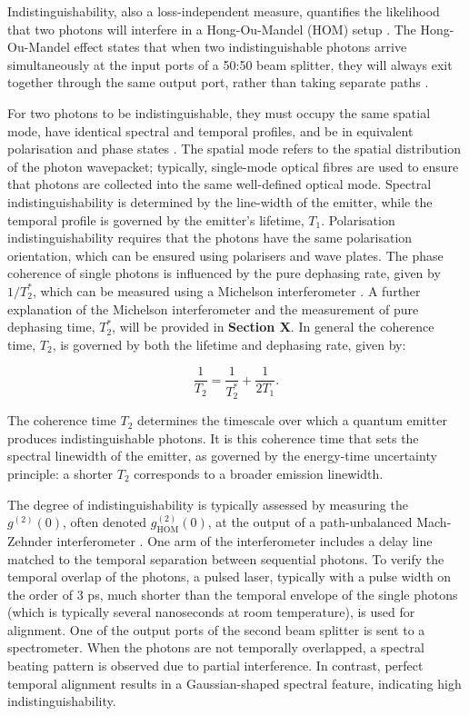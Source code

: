 Indistinguishability, also a loss-independent measure, quantifies the likelihood that two photons will interfere in a Hong-Ou-Mandel (HOM) setup \cite{Hong1987}. The Hong-Ou-Mandel effect states that when two indistinguishable photons arrive simultaneously at the input ports of a 50:50 beam splitter, they will always exit together through the same output port, rather than taking separate paths \cite{Hong1987}.

For two photons to be indistinguishable, they must occupy the same spatial mode, have identical spectral and temporal profiles, and be in equivalent polarisation and phase states \cite{Senellart2017}. The spatial mode refers to the spatial distribution of the photon wavepacket; typically, single-mode optical fibres are used to ensure that photons are collected into the same well-defined optical mode. Spectral indistinguishability is determined by the line-width of the emitter, while the temporal profile is governed by the emitter’s lifetime, $T_1$. Polarisation indistinguishability requires that the photons have the same polarisation orientation, which can be ensured using polarisers and wave plates. The phase coherence of single photons is influenced by the pure dephasing rate, given by $1/T_2^*$, which can be measured using a Michelson interferometer \cite{Michelson1887, Jelezko2003}. A further explanation of the Michelson interferometer and the measurement of pure dephasing time, $T_2^*$, will be provided in \textbf{Section X}. In general the coherence time, $T_2$, is governed by both the lifetime and dephasing rate, given by:

\begin{equation}
    \frac{1}{T_2}=\frac{1}{T_2^*} + \frac{1}{2T_1}.
\end{equation}

The coherence time $T_2$ determines the timescale over which a quantum emitter produces indistinguishable photons. It is this coherence time that sets the spectral linewidth of the emitter, as governed by the energy-time uncertainty principle: a shorter $T_2$  corresponds to a broader emission linewidth.

The degree of indistinguishability is typically assessed by measuring the $g^{(2)}(0)$, often denoted $g^{(2)}_{\text{HOM}}(0)$, at the output of a path-unbalanced Mach-Zehnder interferometer \cite{Rarity2024}. One arm of the interferometer includes a delay line matched to the temporal separation between sequential photons. To verify the temporal overlap of the photons, a pulsed laser, typically with a pulse width on the order of 3 ps, much shorter than the temporal envelope of the single photons (which is typically several nanoseconds at room temperature), is used for alignment. One of the output ports of the second beam splitter is sent to a spectrometer. When the photons are not temporally overlapped, a spectral beating pattern is observed due to partial interference. In contrast, perfect temporal alignment results in a Gaussian-shaped spectral feature, indicating high indistinguishability.


